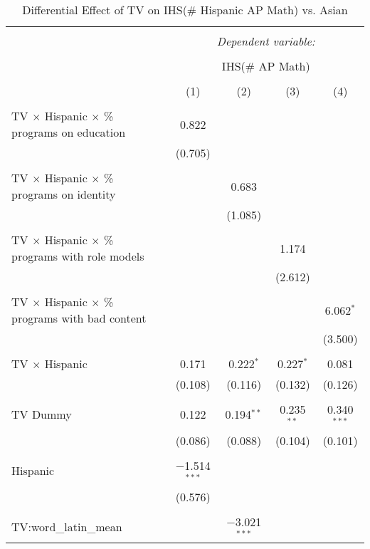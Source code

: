 
\begin{table}[!htbp] \centering 
  \caption{Differential Effect of TV on IHS(\# Hispanic AP Math) vs. Asian} 
  \label{} 
\begin{tabular}{@{\extracolsep{-2pt}}lcccc} 
\\[-1.8ex]\hline 
\hline \\[-1.8ex] 
 & \multicolumn{4}{c}{\textit{Dependent variable:}} \\ 
\cline{2-5} 
\\[-1.8ex] & \multicolumn{4}{c}{IHS(\# AP Math)} \\ 
\\[-1.8ex] & (1) & (2) & (3) & (4)\\ 
\hline \\[-1.8ex] 
 TV $\times$ Hispanic $\times$ \% programs on education & 0.822 &  &  &  \\ 
  & (0.705) &  &  &  \\ 
  & & & & \\ 
 TV $\times$ Hispanic $\times$ \% programs on identity &  & 0.683 &  &  \\ 
  &  & (1.085) &  &  \\ 
  & & & & \\ 
 TV $\times$ Hispanic $\times$ \% programs with role models &  &  & 1.174 &  \\ 
  &  &  & (2.612) &  \\ 
  & & & & \\ 
 TV $\times$ Hispanic $\times$ \% programs with bad content &  &  &  & 6.062$^{*}$ \\ 
  &  &  &  & (3.500) \\ 
  & & & & \\ 
 TV $\times$ Hispanic & 0.171 & 0.222$^{*}$ & 0.227$^{*}$ & 0.081 \\ 
  & (0.108) & (0.116) & (0.132) & (0.126) \\ 
  & & & & \\ 
 TV Dummy & 0.122 & 0.194$^{**}$ & 0.235$^{**}$ & 0.340$^{***}$ \\ 
  & (0.086) & (0.088) & (0.104) & (0.101) \\ 
  & & & & \\ 
 Hispanic & $-$1.514$^{***}$ &  &  &  \\ 
  & (0.576) &  &  &  \\ 
  & & & & \\ 
 TV:word\_latin\_mean &  & $-$3.021$^{***}$ &  &  \\ 

\end{tabular}
\end{table}
